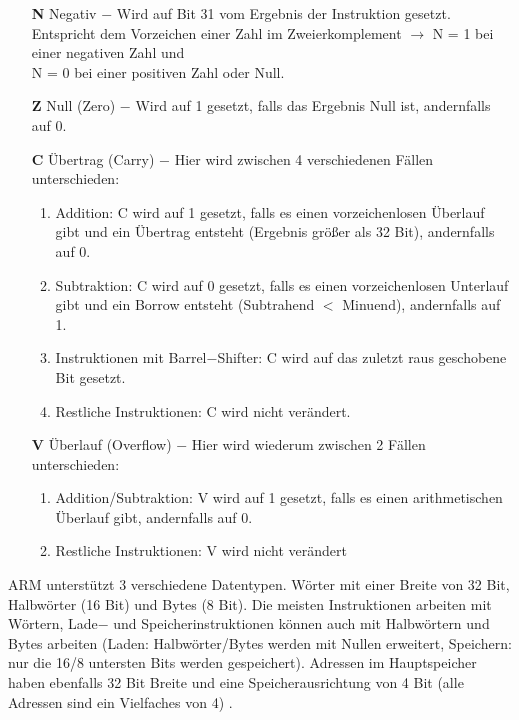 \documentclass[a4paper, 11pt, onecolumn]{article}
\begin{document}
\begin{itemize}[labelindent=1.5em,labelsep=0.5cm,leftmargin=*]
\item[\textbf{N}] Negativ $-$ Wird auf Bit 31 vom Ergebnis der Instruktion gesetzt. Entspricht dem Vorzeichen einer Zahl im Zweierkomplement $\rightarrow$ N = 1 bei einer negativen Zahl und\\N = 0 bei einer positiven Zahl oder Null.
\item[\textbf{Z}] Null (Zero) $-$ Wird auf 1 gesetzt, falls das Ergebnis Null ist, andernfalls auf 0.
\item[\textbf{C}] Übertrag (Carry) $-$ Hier wird zwischen 4 verschiedenen Fällen unterschieden:
\begin{enumerate}[labelindent=0em,labelsep=0.5cm,leftmargin=*]
\item Addition: C wird auf 1 gesetzt, falls es einen vorzeichenlosen Überlauf gibt und ein Übertrag entsteht (Ergebnis größer als 32 Bit), andernfalls auf 0.
\item Subtraktion: C wird auf 0 gesetzt, falls es einen vorzeichenlosen Unterlauf gibt und ein Borrow entsteht (Subtrahend $<$ Minuend), andernfalls auf 1.
\item Instruktionen mit Barrel$-$Shifter: C wird auf das zuletzt raus geschobene Bit gesetzt.
\item Restliche Instruktionen: C wird nicht verändert.
\end{enumerate}
\item[\textbf{V}] Überlauf (Overflow) $-$ Hier wird wiederum zwischen 2 Fällen unterschieden:
\begin{enumerate}[labelindent=0em,labelsep=0.5cm,leftmargin=*]
\item Addition/Subtraktion: V wird auf 1 gesetzt, falls es einen arithmetischen Überlauf gibt, andernfalls auf 0.
\item Restliche Instruktionen: V wird nicht verändert
\end{enumerate}
\end{itemize}

ARM unterstützt 3 verschiedene Datentypen. Wörter mit einer Breite von 32 Bit, Halbwörter (16 Bit) und Bytes (8 Bit). Die meisten Instruktionen arbeiten mit Wörtern, Lade$-$ und Speicherinstruktionen können auch mit Halbwörtern und Bytes arbeiten (Laden: Halbwörter/Bytes werden mit Nullen erweitert, Speichern: nur die 16/8 untersten Bits werden gespeichert). Adressen im Hauptspeicher haben ebenfalls 32 Bit Breite und eine Speicherausrichtung von 4 Bit (alle Adressen sind ein Vielfaches von 4) \cite{arm:2005}. 
\end{document}
